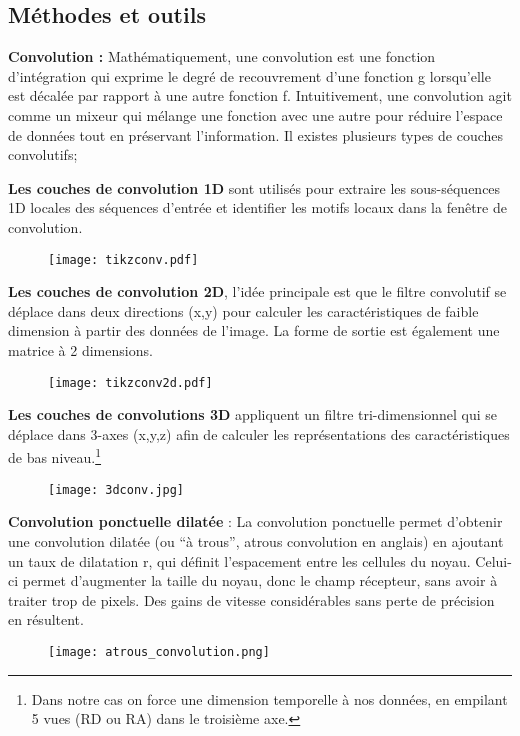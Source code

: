 \subsection{Méthodes et outils}
\textbf{Convolution :} Mathématiquement, une convolution est une fonction d'intégration qui exprime le degré de recouvrement d'une fonction g lorsqu'elle est décalée par rapport à une autre fonction f.
Intuitivement, une convolution agit comme un mixeur qui mélange une fonction avec une autre pour réduire l'espace de données tout en préservant l'information. Il existes plusieurs types de couches convolutifs; 

\textbf{Les couches de convolution 1D} sont utilisés pour extraire les sous-séquences 1D locales des séquences d'entrée et identifier les motifs locaux dans la fenêtre de convolution.
\begin{figure}[hbt!]
  \centering
  \texttt{[image: tikzconv.pdf]}
\end{figure}

\textbf{Les couches de convolution 2D}, l'idée principale est que le filtre convolutif se déplace dans deux directions (x,y) pour calculer les caractéristiques de faible dimension à partir des données de l'image. La forme de sortie est également une matrice à 2 dimensions.
\begin{figure}[hbt!]
  \centering
  \texttt{[image: tikzconv2d.pdf]}
\end{figure}

\textbf{Les couches de convolutions 3D} appliquent un filtre tri-dimensionnel qui se déplace dans 3-axes  (x,y,z) afin de calculer les représentations des caractéristiques de bas niveau.\footnote{Dans notre cas on force une dimension temporelle à nos données, en empilant 5 vues (RD ou RA) dans le troisième axe.}
\begin{figure}[hbt!]
  \centering
  \texttt{[image: 3dconv.jpg]}
\end{figure}

\textbf{Convolution ponctuelle dilatée} : La convolution ponctuelle permet d’obtenir une convolution dilatée (ou “à trous”, atrous convolution en anglais) en ajoutant un taux de dilatation r, qui définit l'espacement entre les cellules du noyau. Celui-ci permet d'augmenter la taille du noyau, donc le champ récepteur, sans avoir à traiter trop de pixels. Des gains de vitesse considérables sans perte de précision en résultent.
\begin{figure}[hbt!]
  \centering
  \texttt{[image: atrous\_convolution.png]}
\end{figure}

